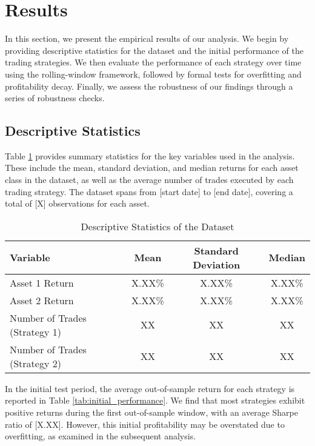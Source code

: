 \section{Results}

In this section, we present the empirical results of our analysis. We begin by providing descriptive statistics for the dataset and the initial performance of the trading strategies. We then evaluate the performance of each strategy over time using the rolling-window framework, followed by formal tests for overfitting and profitability decay. Finally, we assess the robustness of our findings through a series of robustness checks.

\subsection{Descriptive Statistics}

Table \ref{tab:descriptive_stats} provides summary statistics for the key variables used in the analysis. These include the mean, standard deviation, and median returns for each asset class in the dataset, as well as the average number of trades executed by each trading strategy. The dataset spans from [start date] to [end date], covering a total of [X] observations for each asset.

\begin{table}[H]
    \centering
    \caption{Descriptive Statistics of the Dataset}
    \label{tab:descriptive_stats}
    \begin{tabular}{lccc}
        \hline
        \textbf{Variable} & \textbf{Mean} & \textbf{Standard Deviation} & \textbf{Median} \\
        \hline
        Asset 1 Return & X.XX\% & X.XX\% & X.XX\% \\
        Asset 2 Return & X.XX\% & X.XX\% & X.XX\% \\
        Number of Trades (Strategy 1) & XX & XX & XX \\
        Number of Trades (Strategy 2) & XX & XX & XX \\
        \hline
    \end{tabular}
\end{table}

In the initial test period, the average out-of-sample return for each strategy is reported in Table \ref{tab:initial_performance}. We find that most strategies exhibit positive returns during the first out-of-sample window, with an average Sharpe ratio of [X.XX]. However, this initial profitability may be overstated due to overfitting, as examined in the subsequent analysis.


